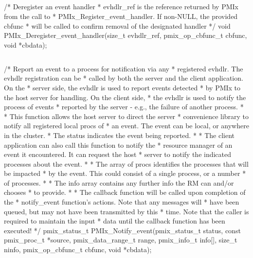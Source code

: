\subsection{}

\cspecificstart
\begin{codepar}
/* Deregister an event handler
 * evhdlr_ref is the reference returned by PMIx from the call to
 * PMIx_Register_event_handler. If non-NULL, the provided cbfunc
 * will be called to confirm removal of the designated handler */
void
PMIx_Deregister_event_handler(size_t evhdlr_ref,
                              pmix_op_cbfunc_t cbfunc,
                              void *cbdata);
\end{codepar}
\cspecificend


\subsection{}

\cspecificstart
\begin{codepar}
/* Report an event to a process for notification via any
 * registered evhdlr. The evhdlr registration can be
 * called by both the server and the client application. On the
 * server side, the evhdlr is used to report events detected
 * by PMIx to the host server for handling. On the client side,
 * the evhdlr is used to notify the process of events
 * reported by the server - e.g., the failure of another process.
 *
 * This function allows the host server to direct the server
 * convenience library to notify all registered local procs of
 * an event. The event can be local, or anywhere in the cluster.
 * The status indicates the event being reported.
 *
 * The client application can also call this function to notify the
 * resource manager of an event it encountered. It can request the host
 * server to notify the indicated processes about the event.
 *
 * The array of procs identifies the processes that will be impacted
 * by the event. This could consist of a single process, or a number
 * of processes.
 *
 * The info array contains any further info the RM can and/or chooses
 * to provide.
 *
 * The callback function will be called upon completion of the
 * notify_event function's actions. Note that any messages will
 * have been queued, but may not have been transmitted by this
 * time. Note that the caller is required to maintain the input
 * data until the callback function has been executed!
*/
pmix_status_t
PMIx_Notify_event(pmix_status_t status,
                  const pmix_proc_t *source,
                  pmix_data_range_t range,
                  pmix_info_t info[], size_t ninfo,
                  pmix_op_cbfunc_t cbfunc, void *cbdata);
\end{codepar}
\cspecificend


